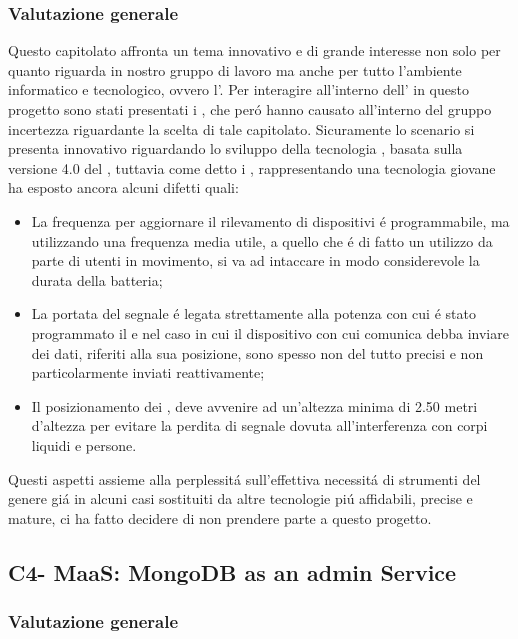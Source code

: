 \subsubsection{Valutazione generale}
Questo capitolato affronta un tema innovativo e di grande interesse non solo per quanto riguarda in nostro gruppo di lavoro ma anche per tutto l'ambiente informatico e tecnologico, ovvero l'.
Per interagire all'interno dell' in questo progetto sono stati presentati i , che per\'o hanno causato all'interno del gruppo incertezza riguardante la scelta di tale capitolato.
Sicuramente lo scenario si presenta innovativo riguardando lo sviluppo della tecnologia , basata sulla versione 4.0 del , tuttavia come detto i , rappresentando una tecnologia giovane ha esposto ancora alcuni difetti quali:
\begin{itemize}
	\item La frequenza per aggiornare il rilevamento di dispositivi \'e programmabile, ma utilizzando una frequenza media utile, a quello che \'e di fatto un utilizzo da parte di utenti in movimento, si va ad intaccare in modo considerevole la durata della batteria;
	\item La portata del segnale \'e legata strettamente alla potenza con cui \'e stato programmato il  e nel caso in cui il dispositivo con cui comunica debba inviare dei dati, riferiti alla sua posizione, sono spesso non del tutto precisi e non particolarmente inviati reattivamente;
	\item Il posizionamento dei , deve avvenire ad un'altezza minima di 2.50 metri d'altezza per evitare la perdita di segnale dovuta all'interferenza con corpi liquidi e persone.
\end{itemize}
Questi aspetti assieme alla perplessit\'a sull'effettiva necessit\'a di strumenti del genere gi\'a in alcuni casi sostituiti da altre tecnologie pi\'u affidabili, precise e mature, ci ha fatto decidere di non prendere parte a questo progetto.

\subsection{C4- MaaS: MongoDB as an admin Service}
\subsubsection{Valutazione generale}



